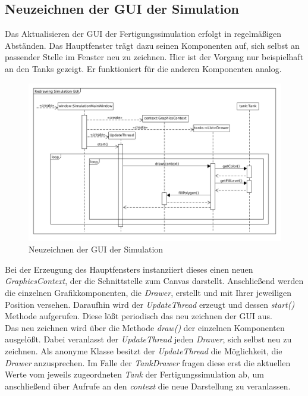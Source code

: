 \documentclass[parskip=full]{scrartcl}
\begin{document}
\subsection{Neuzeichnen der GUI der Simulation}
  Das Aktualisieren der GUI der Fertigungssimulation erfolgt in regelm\"a{\ss}igen Abst\"anden. Das Hauptfenster tr\"agt dazu seinen Komponenten auf,
  sich selbst an passender Stelle im Fenster neu zu zeichnen. Hier ist der Vorgang nur beispielhaft an den Tanks gezeigt. Er funktioniert
  f\"ur die anderen Komponenten analog.
  \begin{figure}[H]
    \centering
    \includegraphics[scale=0.35]{design/sequence-diagrams/simulation-redraw.png}
    \caption{Neuzeichnen der GUI der Simulation}
  \end{figure}
  Bei der Erzeugung des Hauptfensters instanziiert dieses einen neuen \emph{GraphicsContext}, der die Schnittstelle zum Canvas darstellt.
  Anschlie{\ss}end werden die einzelnen Grafikkomponenten, die \emph{Drawer}, erstellt und mit Ihrer jeweiligen Position versehen.
  Daraufhin wird der \emph{UpdateThread} erzeugt und dessen \emph{start()} Methode aufgerufen. Diese l\"o{\ss}t periodisch das
  neu zeichnen der GUI aus.\\
  Das neu zeichnen wird \"uber die Methode \emph{draw()} der einzelnen Komponenten ausgel\"o{\ss}t. Dabei veranlasst der \emph{UpdateThread} jeden \emph{Drawer},
  sich selbst neu zu zeichnen. Als anonyme Klasse besitzt der \emph{UpdateThread} die M\"oglichkeit, die \emph{Drawer} anzusprechen. Im Falle der 
  \emph{TankDrawer} fragen diese erst die aktuellen Werte vom jeweils zugeordneten \emph{Tank} der Fertigungssimulation ab, um anschlie{\ss}end
  \"uber Aufrufe an den \emph{context} die neue Darstellung zu veranlassen.
\end{document}
